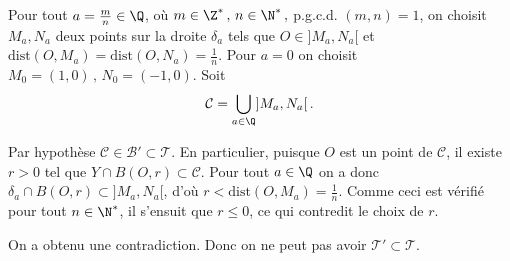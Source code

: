 {\begin{enumerate}
{Pour tout $a=\frac{m}{n}\in \Q$, o\`u $m\in \Z^*\, ,\, n\in \N^*\,
,$ p.g.c.d. $(m,n)=1$, on choisit $M_a,N_a$ deux points sur la
droite $\delta_a$ tels que $O\in ]M_a,N_a[$ et $\mathrm{dist}
(O,M_a)=\mathrm{dist} (O,N_a)=\frac{1}{n}$. Pour $a=0$ on choisit
$M_0=(1,0)\, ,\, N_0=(-1,0)$. Soit
$$
\mathcal{C}=\bigcup_{a\in \Q} ]M_a,N_a[\, .
$$

Par hypoth\`ese $\mathcal{C}\in \mathcal{B}'\subset \mathcal{T}$. En particulier,
puisque $O$ est un point de $\mathcal{C}$, il existe $r>0$ tel que
$Y\cap B(O,r)\subset \mathcal{C}$. Pour tout $a\in \Q$ on a donc
$\delta_a\cap B(O,r)\subset ]M_a,N_a[$, d'o\`u $r<\mathrm{dist}
(O,M_a)=\frac{1}{n}$. Comme ceci est v\'erifi\'e pour tout $n\in
\N^*$, il s'ensuit que $r\leq 0$, ce qui contredit le choix de
$r$.

On a obtenu une contradiction. Donc on ne peut pas avoir
$\mathcal{T}'\subset \mathcal{T}$.}
\end{enumerate}
}